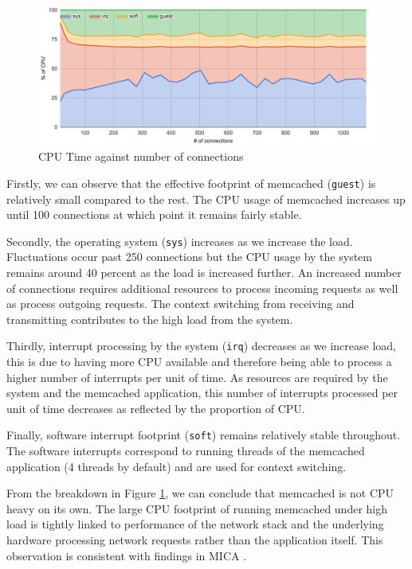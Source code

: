 \begin{figure}[h]
    \includegraphics[width=\textwidth]{./res/5_default_cpu.png}
    \caption{CPU Time against number of connections}
    \label{fig:memcached-default-cpu}
\end{figure}

Firstly, we can observe that the effective footprint of memcached (\texttt{guest}) is relatively small compared to the rest. The CPU usage of memcached increases up until 100 connections at which point it remains fairly stable.

Secondly, the operating system (\texttt{sys}) increases as we increase the load. Fluctuations occur past 250 connections but the CPU usage by the system remains around 40 percent as the load is increased further. An increased number of connections requires additional resources to process incoming requests as well as process outgoing requests. The context switching from receiving and transmitting contributes to the high load from the system.

Thirdly, interrupt processing by the system (\texttt{irq}) decreases as we increase load, this is due to having more CPU available and therefore being able to process a higher number of interrupts per unit of time. As resources are required by the system and the memcached application, this number of interrupts processed per unit of time decreases as reflected by the proportion of CPU.

Finally, software interrupt footprint (\texttt{soft}) remains relatively stable throughout. The software interrupts correspond to running threads of the memcached application (4 threads by default) and are used for context switching.

From the breakdown in Figure \ref{fig:memcached-default-cpu}, we can conclude that memcached is not CPU heavy on its own. The large CPU footprint of running memcached under high load is tightly linked to performance of the network stack and the underlying hardware processing network requests rather than the application itself. This observation is consistent with findings in MICA \cite{lim2014mica}.




